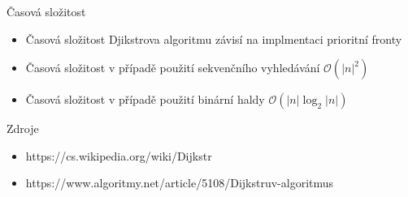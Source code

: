 \documentclass[10pt, hyperref={unicode}]{beamer}
\begin{document}
\begin{frame}{Časová složitost}
\bigskip
	\begin{itemize}
		\item Časová složitost Djikstrova algoritmu závisí na implmentaci prioritní fronty
		\item Časová složitost v případě použití sekvenčního vyhledávání $\mathcal{O}({|n|}^2)$
		\item Časová složitost v případě použití binární haldy $\mathcal{O}(|n|\log_2{|n|})$
	\end{itemize}
\end{frame}

\begin{frame}{Zdroje}
\bigskip
	\begin{itemize}
		\item https://cs.wikipedia.org/wiki/Dijkstr%
		\item https://www.algoritmy.net/article/5108/Dijkstruv-algoritmus
	\end{itemize}
\end{frame}
\end{document}
